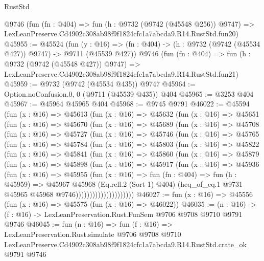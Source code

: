 \begin{lexlean}{RustStd}
\begin{coremodule}
    @9746
    (fun (fn : @404) =>
    fun (h : @9732 (@9742 (@45548 @256)) @9747) =>
    LexLeanPreserve.Cd4902c308ab98f9f1824cfc1a7abcda9.R14.RustStd.fun20)
@45955 := @45524
    (fun (y : @16) => (fn : @404) -> (h : @9732 (@9742 (@45534 @427)) @9747) -> @9711 (@45539 @427))
    @9746
    (fun (fn : @404) =>
    fun (h : @9732 (@9742 (@45548 @427)) @9747) =>
    LexLeanPreserve.Cd4902c308ab98f9f1824cfc1a7abcda9.R14.RustStd.fun21)
@45959 := @9732 (@9742 (@45534 @435)) @9747
@45964 := Option.noConfusion.{0, 0} (@9711 (@45539 @435)) @404
@45965 := @3253 @404
@45967 := @45964 @45965 @404
@45968 := @9745 @9791
@46022 := @45594
    (fun (x : @16) =>
    @45613
      (fun (x : @16) =>
      @45632
        (fun (x : @16) =>
        @45651
          (fun (x : @16) =>
          @45670
            (fun (x : @16) =>
            @45689
              (fun (x : @16) =>
              @45708
                (fun (x : @16) =>
                @45727
                  (fun (x : @16) =>
                  @45746
                    (fun (x : @16) =>
                    @45765
                      (fun (x : @16) =>
                      @45784
                        (fun (x : @16) =>
                        @45803
                          (fun (x : @16) =>
                          @45822
                            (fun (x : @16) =>
                            @45841
                              (fun (x : @16) =>
                              @45860
                                (fun (x : @16) =>
                                @45879
                                  (fun (x : @16) =>
                                  @45898
                                    (fun (x : @16) =>
                                    @45917
                                      (fun (x : @16) =>
                                      @45936
                                        (fun (x : @16) =>
                                        @45955
                                          (fun (x : @16) =>
                                          fun (fn : @404) =>
                                          fun (h : @45959) =>
                                          @45967
                                            @45968
                                            (Eq.refl.{2} (Sort 1) @404)
                                            (heq_of_eq.{1}
                                              @9731
                                              @45965
                                              @45968
                                              @9746)))))))))))))))))))))
@46027 := fun (x : @16) => @45556 (fun (x : @16) => @45575 (fun (x : @16) => @46022))
@46035 := (n : @16) -> (f : @16) -> LexLeanPreservation.Rust.FunSem @9706 @9708 @9710 @9791 @9746
@46045 := fun (n : @16) =>
  fun (f : @16) =>
  LexLeanPreservation.Rust.simulate
    @9706
    @9708
    @9710
    LexLeanPreserve.Cd4902c308ab98f9f1824cfc1a7abcda9.R14.RustStd.crate_ok
    @9791
    @9746
\end{coremodule}
\end{lexlean}
